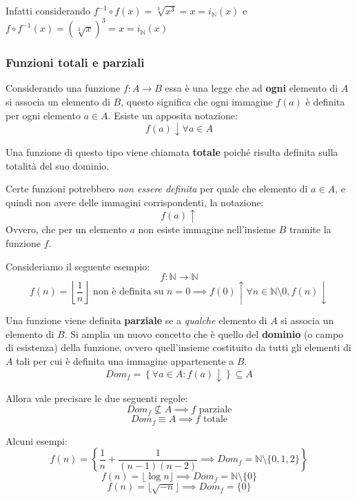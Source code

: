 \documentclass{article}
\begin{document}
Infatti considerando $f^{-1}\circ f(x) = \sqrt[3]{x^3}=x=i_\mathbb{N}(x)$ e $f\circ f^{-1}(x)=(\sqrt[3]{x})^3=x=i_\mathbb{N}(x)$

\subsubsection{Funzioni totali e parziali}
Considerando una funzione $f:A\rightarrow B$ essa è una legge che ad \textbf{ogni} elemento di $A$ si associa
un elemento di $B$, questo significa che ogni immagine $f(a)$ è definita per ogni elemento $a\in A$. Esiste
un apposita notazione:
$$f(a)\downarrow \forall a\in A$$

Una funzione di questo tipo viene chiamata \textbf{totale} poiché risulta definita sulla totalità del suo dominio.

Certe funzioni potrebbero \textit{non essere definita} per quale che elemento di $a\in A$, e quindi non avere delle immagini corrispondenti, la notazione:
$$f(a)\uparrow$$
Ovvero, che per un elemento $a$ non esiste immagine nell'insieme $B$ tramite la funzione $f$.

Consideriamo il seguente esempio:
$$f:\mathbb{N}\rightarrow\mathbb{N}$$
$$f(n)=\left\lfloor\frac{1}{n}\right\rfloor \text{ non è definita su } n=0\implies f(0)\uparrow \forall n\in\mathbb{N}\setminus{0}, f(n)\downarrow$$

Una funzione viene definita \textbf{parziale} se a \textit{qualche} elemento di $A$ si associa un elemento di $B$. Si amplia un nuovo concetto che è quello del \textbf{dominio} (o campo di esistenza) della funzione,
ovvero quell'insieme costituito da tutti gli elementi di $A$ tali per cui è definita una immagine appartenente a $B$.
$$Dom_f=\left\{\forall a\in A : f(a)\downarrow \right\}\subseteq A$$

Allora vale precisare le due seguenti regole:
$$Dom_f\nsubseteq A\implies f\text{ parziale}$$
$$Dom_f\equiv A\implies f \text{ totale}$$

Alcuni esempi:
$$f(n)=\left\{\frac{1}{n}+\frac{1}{(n-1)(n-2)}\implies Dom_f=\mathbb{N}\setminus\{0,1,2\}\right\}$$
$$f(n)=\lfloor\log{n}\rfloor\implies Dom_f=\mathbb{N}\setminus\{0\}$$
$$f(n)=\lfloor\sqrt{-n}\rfloor \implies Dom_f=\{0\}$$
\end{document}
